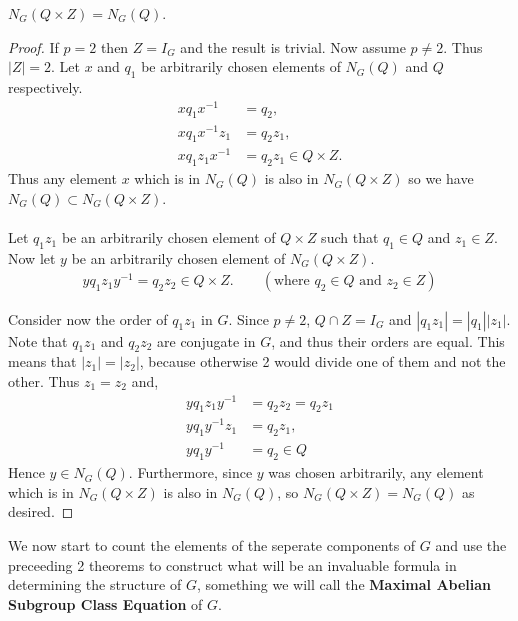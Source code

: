 \begin{footnotesize}
\begin{lemma}
\label{normalizer_Sylow_join_center_eq_normalizer_Sylow}
\leanok
$N_G(Q \times Z) = N_G(Q)$.
\end{lemma}

\begin{proof} 

If $p = 2$ then $Z = I_G$ and the result is trivial. Now assume $p \neq 2$. Thus $|Z| = 2$. Let $x$ and $q_1$ be arbitrarily chosen elements of $N_G(Q)$ and $Q$ respectively.
\begin{align*} xq_1x^{-1} &= q_2, \tag{for some $q_2 \in Q$}
\\ xq_1x^{-1}z_1 &= q_2z_1,
\\ xq_1z_1x^{-1} &= q_2z_1 \in Q \times Z.
\end{align*}
Thus any element $x$ which is in $N_G(Q)$ is also in $N_G(Q \times Z)$ so we have $N_G(Q) \subset N_G(Q \times Z)$. \\
\\
Let $q_1 z_1$ be an arbitrarily chosen element of $Q \times Z$ such that $q_1 \in Q$ and $z_1 \in Z$. Now let $y$ be an arbitrarily chosen element of $N_G(Q \times Z)$.
\begin{align*} y q_1 z_1 y^{-1} = q_2 z_2 \in Q \times Z. \qquad (\text{where $q_2 \in Q$ and $z_2 \in Z$}) 
\end{align*}

Consider now the order of $q_1z_1$ in $G$. Since $p \neq 2$, $Q \cap Z = I_G$ and $|q_1 z_1| = |q_1| |z_1|$. Note that $q_1 z_1$ and $q_2 z_2$ are conjugate in $G$, and thus their orders are equal. This means that $|z_1| = |z_2|$, because otherwise 2 would divide one of them and not the other. Thus $z_1 = z_2$ and,
\begin{align*} y q_1z_1 y^{-1} &=  q_2z_2 = q_2z_1
\\ y q_1 y^{-1} z_1 &= q_2z_1,
\\ y q_1 y^{-1} &= q_2 \in Q
\end{align*}
Hence $y \in N_G(Q)$. Furthermore, since $y$ was chosen arbitrarily, any element which is in $N_G(Q \times Z)$ is also in $N_G(Q)$, so $N_G(Q \times Z) = N_G(Q)$ as desired.

\end{proof}


We now start to count the elements of the seperate components of $G$ and use the preceeding 2 theorems to construct what will be an invaluable formula in determining the structure of $G$, something we will call the \textbf{Maximal Abelian Subgroup Class Equation} of $G$. \\


\end{footnotesize}
